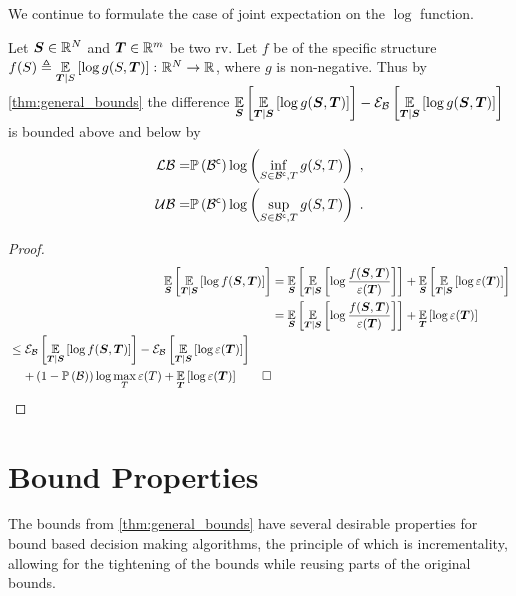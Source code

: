 We continue to formulate the case of joint expectation on the $\log$ function.
\begin{proposition}
	\label{thm:bound_exp}
	Let $\boldsymbol S\in\mathbb{R}^N$ and $\boldsymbol T\in\mathbb{R}^m$ be two \gls{rv}. Let $f$ be of the specific structure $f(S)\triangleq \operatorname*{\mathbb{E}}\limits_{\boldsymbol T\mid S}\left[{\log g(S,\boldsymbol T)}\right]\colon\mathbb{R}^N\to\mathbb{R}$, where $g$ is non-negative. Thus by \cref{thm:general_bounds} the difference $\operatorname*{\mathbb{E}}\limits_{\boldsymbol S}\left[{\operatorname*{\mathbb{E}}\limits_{\boldsymbol T\mid\boldsymbol S}\left[{\log g(\boldsymbol S,\boldsymbol T)}\right]}\right]-
	\mathcal{E}_{\mathcal B}\left[{\operatorname*{\mathbb{E}}\limits_{\boldsymbol T\mid\boldsymbol S}\left[{\log g(\boldsymbol S,\boldsymbol T)}\right]}\right]$ is bounded above and below by
	\begin{align}
			\operatorname*{\mathcal{LB}}=&\mathbb{P}\left({{\mathcal B}^{\mathsf{c}}}\right)\log\left(\inf_{S\in{\ensuremath{\mathcal B}}^{\mathsf{c}},T}g(S,T)\right)\;,\label{eq:bound_lower_exp}\\
			\operatorname*{\mathcal{UB}}=&\mathbb{P}\left({{\mathcal B}^{\mathsf{c}}}\right)\log\left(\sup_{S\in{\ensuremath{\mathcal B}}^{\mathsf{c}},T}g(S,T)\right)\;.\label{eq:bound_upper_exp}
	\end{align}
\end{proposition}
\begin{proof}
	\begin{align*}
		\expectation{\expectation{\log f(\RV,\RVI)}{\RVI\mid\RV}}{\RV}&=\expectation{\expectation{\log \frac{f(\RV,\RVI)}{\varepsilon(\RVI)}}{\RVI\mid\RV}}{\RV}+\expectation{\expectation{\log \varepsilon(\RVI)}{\RVI\mid\RV}}{\RV}
		\\
		&=\expectation{\expectation{\log \frac{f(\RV,\RVI)}{\varepsilon(\RVI)}}{\RVI\mid\RV}}{\RV}+\expectation{\log \varepsilon(\RVI)}{\RVI}
		\\
		\begin{split}
			&\leq\partialexpectation{\expectation{\log f(\RV,\RVI)}{\RVI\mid\RV}}{\subSpace}-\partialexpectation{\expectation{\log \varepsilon(\RVI)}{\RVI\mid\RV}}{\subSpace}\\
			&\phantomeq+\left(1-\measure{\subSpace}\right)\log\max_{\variableI}\varepsilon(\variableI)+\expectation{\log \varepsilon(\RVI)}{\RVI}\qed
		\end{split}
	\end{align*}
\end{proof}

\section{Bound Properties}\label{sec:properties}
The bounds from \cref{thm:general_bounds} have several desirable properties for bound based decision making algorithms, the principle of which is incrementality, allowing for the tightening of the bounds while reusing parts of the original bounds.


